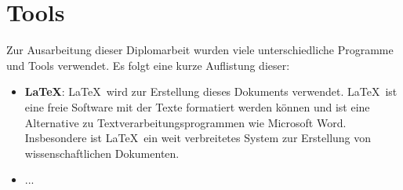 \ifoot{\leftmark}
\chapter{Tools}
\noindent Zur Ausarbeitung dieser Diplomarbeit wurden viele unterschiedliche Programme und Tools verwendet. Es folgt eine kurze Auflistung dieser:
\begin{itemize}
	\item \textbf{\LaTeX}: \LaTeX \ wird zur Erstellung dieses Dokuments verwendet. \LaTeX \ ist eine freie Software mit der Texte formatiert werden können und ist eine Alternative zu Textverarbeitungsprogrammen wie Microsoft Word. Insbesondere ist \LaTeX \ ein weit verbreitetes System zur Erstellung von wissenschaftlichen Dokumenten. \cite[vgl.][]{latex_o.J.}
	\item ...
\end{itemize}
